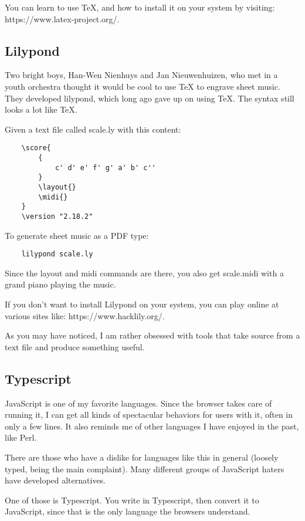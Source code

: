 You can learn to use TeX, and how to install it on your system by visiting:
https://www.latex-project.org/.

\subsection{Lilypond}

Two bright boys, Han-Wen Nienhuys and Jan Nieuwenhuizen, who met in a youth
orchestra thought it would be
cool to use TeX to engrave sheet music. They developed lilypond,
which long ago gave up on using TeX. The syntax still looks a lot
like TeX.

Given a text file called scale.ly with this content:

{\footnotesize
\begin{verbatim}
    \score{
        {
            c' d' e' f' g' a' b' c''
        }
        \layout{}
        \midi{}
    }
    \version "2.18.2"
\end{verbatim}
}

To generate sheet music as a PDF type:

{\footnotesize
\begin{verbatim}
    lilypond scale.ly
\end{verbatim}
}

Since the layout and midi commands are there, you also get scale.midi
with a grand piano playing the music.

If you don't want to install Lilypond on your system, you can play
online at various sites like: https://www.hacklily.org/.

As you may have noticed, I am rather obsessed with tools that take
source from a text file and produce something useful.

\subsection{Typescript}

JavaScript is one of my favorite languages. Since the browser takes
care of running it, I can get all kinds of spectacular behaviors
for users with it, often in only a few lines. It also reminds me
of other languages I have enjoyed in the past, like Perl.

There are those who have a dislike for languages like this in general
(loosely typed, being the main complaint). Many different groups of
JavaScript haters have developed alternatives.

One of those is Typescript. You write in Typescript, then convert
it to JavaScript, since that is the only language the browsers understand.

